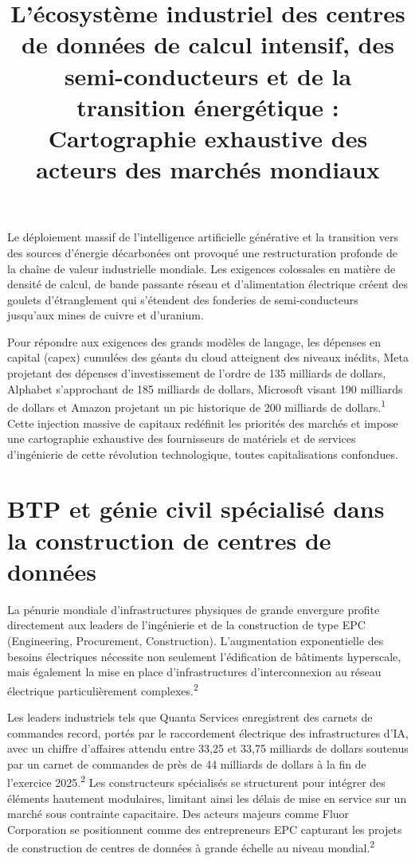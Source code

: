 \documentclass[11pt,a4paper]{article}
\title{\textbf{L'écosystème industriel des centres de données de calcul intensif, des semi-conducteurs et de la transition énergétique : Cartographie exhaustive des acteurs des marchés mondiaux}}
\author{}
\date{}
\begin{document}
\maketitle

Le déploiement massif de l'intelligence artificielle générative et la transition vers des sources d'énergie décarbonées ont provoqué une restructuration profonde de la chaîne de valeur industrielle mondiale. Les exigences colossales en matière de densité de calcul, de bande passante réseau et d'alimentation électrique créent des goulets d'étranglement qui s'étendent des fonderies de semi-conducteurs jusqu'aux mines de cuivre et d'uranium.

Pour répondre aux exigences des grands modèles de langage, les dépenses en capital (capex) cumulées des géants du cloud atteignent des niveaux inédits, Meta projetant des dépenses d'investissement de l'ordre de 135 milliards de dollars, Alphabet s'approchant de 185 milliards de dollars, Microsoft visant 190 milliards de dollars et Amazon projetant un pic historique de 200 milliards de dollars.\textsuperscript{1} Cette injection massive de capitaux redéfinit les priorités des marchés et impose une cartographie exhaustive des fournisseurs de matériels et de services d'ingénierie de cette révolution technologique, toutes capitalisations confondues.

\section*{BTP et génie civil spécialisé dans la construction de centres de données}

La pénurie mondiale d'infrastructures physiques de grande envergure profite directement aux leaders de l'ingénierie et de la construction de type EPC (Engineering, Procurement, Construction). L'augmentation exponentielle des besoins électriques nécessite non seulement l'édification de bâtiments hyperscale, mais également la mise en place d'infrastructures d'interconnexion au réseau électrique particulièrement complexes.\textsuperscript{2}

Les leaders industriels tels que Quanta Services enregistrent des carnets de commandes record, portés par le raccordement électrique des infrastructures d'IA, avec un chiffre d'affaires attendu entre 33,25 et 33,75 milliards de dollars soutenus par un carnet de commandes de près de 44 milliards de dollars à la fin de l'exercice 2025.\textsuperscript{2} Les constructeurs spécialisés se structurent pour intégrer des éléments hautement modulaires, limitant ainsi les délais de mise en service sur un marché sous contrainte capacitaire. Des acteurs majeurs comme Fluor Corporation se positionnent comme des entrepreneurs EPC capturant les projets de construction de centres de données à grande échelle au niveau mondial.\textsuperscript{2}
\end{document}
